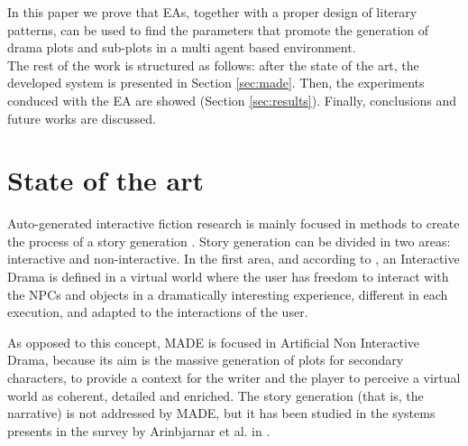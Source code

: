 \documentclass[runningheads]{llncs}
\begin{document}

In this paper we prove that EAs, together with a proper design of literary patterns, can be used to find the parameters that promote the generation of drama plots and sub-plots in a multi agent based environment.\\

The rest of the work is structured as follows: after the state of the art, the developed system is presented in Section \ref{sec:made}. Then, the experiments conduced with the EA are showed (Section \ref{sec:results}). Finally, conclusions and future works are discussed.


\section{State of the art}
\label{sec:soa}


Auto-generated interactive fiction research is mainly focused in methods to create the process of a story generation \cite{nairat2011character}. Story generation can be divided in two areas: interactive and non-interactive. In the first area, and according to \cite{ReviewArinbjarnar09}, an Interactive Drama is defined in a virtual world where the user has freedom to interact with the NPCs and objects in a dramatically interesting experience, different in each execution, and adapted to the interactions of the user.


As opposed to this concept, MADE is focused in Artificial Non Interactive Drama, because its aim is the massive generation of plots for secondary characters, to provide a context for the writer and the player to perceive a virtual world as coherent, detailed and enriched. The story generation (that is, the narrative) is not addressed by MADE, but it has been studied in the systems presents in the survey by Arinbjarnar et al. in \cite{ReviewArinbjarnar09}.

\end{document}
